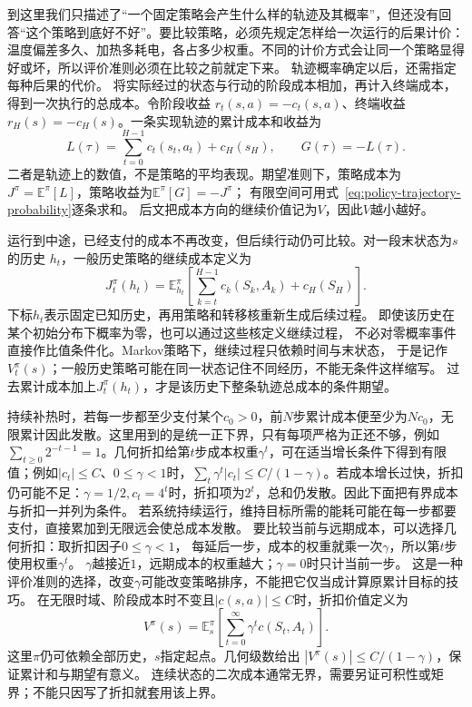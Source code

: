 到这里我们只描述了“一个固定策略会产生什么样的轨迹及其概率”，但还没有回答“这个策略到底好不好”。要比较策略，必须先规定怎样给一次运行的后果计价：温度偏差多久、加热多耗电，各占多少权重。不同的计价方式会让同一个策略显得好或坏，所以评价准则必须在比较之前就定下来。
轨迹概率确定以后，还需指定每种后果的代价。
将实际经过的状态与行动的阶段成本相加，再计入终端成本，得到一次执行的总成本。令阶段收益
$r_t(s,a)=-c_t(s,a)$、终端收益$r_H(s)=-c_H(s)$。一条实现轨迹的累计成本和收益为
\begin{equation}
  L(\tau)=\sum_{t=0}^{H-1}c_t(s_t,a_t)+c_H(s_H),
  \qquad G(\tau)=-L(\tau).
  \label{eq:policy-trajectory-cost-return}
\end{equation}
二者是轨迹上的数值，不是策略的平均表现。期望准则下，策略成本为
$J^\pi=\mathbb E^\pi[L]$，策略收益为$\mathbb E^\pi[G]=-J^\pi$；
有限空间可用式~\eqref{eq:policy-trajectory-probability}逐条求和。
后文把成本方向的继续价值记为$V$，因此$V$越小越好。

运行到中途，已经支付的成本不再改变，但后续行动仍可比较。对一段末状态为$s$的历史
$h_t$，一般历史策略的继续成本定义为
\begin{equation}
  J_t^\pi(h_t)=
  \mathbb E^\pi_{h_t}
  \left[\sum_{k=t}^{H-1}c_k(S_k,A_k)+c_H(S_H)\right].
  \label{eq:decision-finite-policy-value}
\end{equation}
下标$h_t$表示固定已知历史，再用策略和转移核重新生成后续过程。
即使该历史在某个初始分布下概率为零，也可以通过这些核定义继续过程，
不必对零概率事件直接作比值条件化。Markov策略下，继续过程只依赖时间与末状态，
于是记作$V_t^\pi(s)$；一般历史策略可能在同一状态记住不同经历，不能无条件这样缩写。
过去累计成本加上$J_t^\pi(h_t)$，才是该历史下整条轨迹总成本的条件期望。

持续补热时，若每一步都至少支付某个\(c_0>0\)，前\(N\)步累计成本便至少为\(Nc_0\)，无限累计因此发散。这里用到的是统一正下界，只有每项严格为正还不够，例如\(\sum_{t\geq0}2^{-t-1}=1\)。几何折扣给第\(t\)步成本权重\(\gamma^t\)，可在适当增长条件下得到有限值；例如\(|c_t|\leq C\)、\(0\leq\gamma<1\)时，\(\sum_t\gamma^t|c_t|\leq C/(1-\gamma)\)。若成本增长过快，折扣仍可能不足：\(\gamma=1/2,c_t=4^t\)时，折扣项为\(2^t\)，总和仍发散。因此下面把有界成本与折扣一并列为条件。
若系统持续运行，维持目标所需的能耗可能在每一步都要支付，直接累加到无限远会使总成本发散。
要比较当前与远期成本，可以选择几何折扣：取折扣因子$0\leq\gamma<1$，
每延后一步，成本的权重就乘一次$\gamma$，所以第$t$步使用权重$\gamma^t$。
$\gamma$越接近$1$，远期成本的权重越大；$\gamma=0$时只计当前一步。
这是一种评价准则的选择，改变$\gamma$可能改变策略排序，不能把它仅当成计算原累计目标的技巧。
在无限时域、阶段成本时不变且$|c(s,a)|\leq C$时，折扣价值定义为
\begin{equation}
  V^\pi(s)=
  \mathbb E_s^\pi\left[\sum_{t=0}^{\infty}\gamma^t c(S_t,A_t)\right].
  \label{eq:decision-discounted-value}
\end{equation}
这里$\pi$仍可依赖全部历史，$s$指定起点。几何级数给出
$|V^\pi(s)|\leq C/(1-\gamma)$，保证累计和与期望有意义。
连续状态的二次成本通常无界，需要另证可积性或矩界；不能只因写了折扣就套用该上界。

